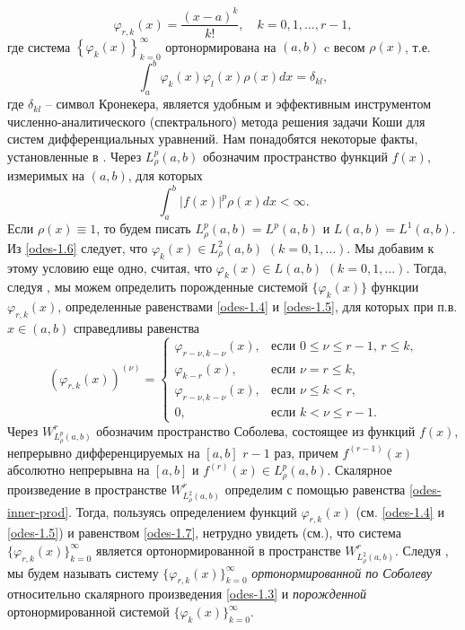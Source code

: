   \begin{equation}\label{odes-1.5}
\varphi_{r,k}(x) =\frac{(x-a)^k}{k!}, \quad k=0,1,\ldots, r-1,
\end{equation}
где система $\left\{\varphi_k(x)\right\}_{k=0}^\infty$ ортонормирована  на $(a,b)$  c весом   $\rho(x)$, т.е.
 \begin{equation}\label{odes-1.6}
\int_a^b\varphi_k(x)\varphi_l(x)\rho(x)dx=\delta_{kl},
\end{equation}
где $\delta_{kl}$ -- символ Кронекера, является удобным и эффективным инструментом  численно-аналитического (спектрального) метода решения задачи Коши для систем дифференциальных уравнений.   Нам понадобятся некоторые факты, установленные в \cite{Shar20}.
  Через $L^p_\rho(a,b)$ обозначим пространство  функций $f(x)$, измеримых  на  $(a,b)$, для которых
 \begin{equation*}
\int_a^b|f(x)|^p\rho(x)dx<\infty.
\end{equation*}
Если $\rho(x)\equiv1$, то будем писать $L^p_\rho(a,b)=L^p(a,b)$ и $L(a,b)=L^1(a,b)$.
Из \eqref{odes-1.6} следует, что $\varphi_k(x)\in L^2_\rho(a,b)$ $(k=0,1,\ldots)$. Мы добавим к этому условию еще одно, считая, что $\varphi_k(x)\in L(a,b)$ $(k=0,1,\ldots)$. Тогда, следуя  \cite{Shar20}, мы можем определить  порожденные системой $\{\varphi_k(x)\}$ функции $\varphi_{r,k}(x)$, определенные равенствами \eqref{odes-1.4} и \eqref{odes-1.5}, для которых при п.в. $x\in (a,b)$ справедливы равенства
 \begin{equation}\label{odes-1.7}
(\varphi_{r,k}(x))^{(\nu)} =\begin{cases}\varphi_{r-\nu,k-\nu}(x),&\text{если $0\le\nu\le r-1$, $r\le k$,}\\
\varphi_{k-r}(x),&\text{если  $\nu=r\le k$,}\\
\varphi_{r-\nu,k-\nu}(x),&\text{если $\nu\le k< r$,}\\
0,&\text{если $k< \nu\le r-1$}.
  \end{cases}
\end{equation}
Через $W^r_{L^p_\rho(a,b)}$ обозначим пространство Соболева, состоящее из функций $f(x)$, непрерывно дифференцируемых на $[a,b]$ $r-1$ раз, причем $f^{(r-1)}(x)$ абсолютно непрерывна на $[a,b]$  и $f^{(r)}(x)\in L^p_\rho(a,b)$.
Скалярное произведение в пространстве $W^r_{L^2_\rho(a,b)}$ определим с помощью равенства \eqref{odes-inner-prod}. Тогда, пользуясь определением функций  $\varphi_{r,k}(x)$ (см. \eqref{odes-1.4} и \eqref{odes-1.5}) и равенством  \eqref{odes-1.7}, нетрудно увидеть (см.\cite{Shar20}),  что система $\{\varphi_{r,k}(x)\}_{k=0}^\infty$ является ортонормированной в пространстве $W^r_{L^2_\rho(a,b)}$. Следуя \cite{Shar20}, мы будем называть систему $\{\varphi_{r,k}(x)\}_{k=0}^\infty$ \textit{ ортонормированной по Соболеву } относительно скалярного произведения \eqref{odes-1.3} и  \textit{ порожденной} ортонормированной системой $\{\varphi_{k}(x)\}_{k=0}^\infty$.

